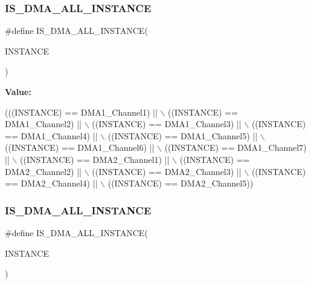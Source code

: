 \subsubsection{\texorpdfstring{I\+S\+\_\+\+D\+M\+A\+\_\+\+A\+L\+L\+\_\+\+I\+N\+S\+T\+A\+N\+CE}{IS\_DMA\_ALL\_INSTANCE}\hspace{0.1cm}{\footnotesize\ttfamily [15/16]}}
{\footnotesize\ttfamily \#define I\+S\+\_\+\+D\+M\+A\+\_\+\+A\+L\+L\+\_\+\+I\+N\+S\+T\+A\+N\+CE(\begin{DoxyParamCaption}\item[{}]{I\+N\+S\+T\+A\+N\+CE }\end{DoxyParamCaption})}

{\bfseries Value\+:}
\begin{DoxyCode}
(((INSTANCE) == DMA1\_Channel1) || \(\backslash\)
                                       ((INSTANCE) == DMA1\_Channel2) || \(\backslash\)
                                       ((INSTANCE) == DMA1\_Channel3) || \(\backslash\)
                                       ((INSTANCE) == DMA1\_Channel4) || \(\backslash\)
                                       ((INSTANCE) == DMA1\_Channel5) || \(\backslash\)
                                       ((INSTANCE) == DMA1\_Channel6) || \(\backslash\)
                                       ((INSTANCE) == DMA1\_Channel7) || \(\backslash\)
                                       ((INSTANCE) == DMA2\_Channel1) || \(\backslash\)
                                       ((INSTANCE) == DMA2\_Channel2) || \(\backslash\)
                                       ((INSTANCE) == DMA2\_Channel3) || \(\backslash\)
                                       ((INSTANCE) == DMA2\_Channel4) || \(\backslash\)
                                       ((INSTANCE) == DMA2\_Channel5))
\end{DoxyCode}
\mbox{\label{group___exported__macro_ga40beb02b397c5f47e22a83fc28034afe}} 
\subsubsection{\texorpdfstring{I\+S\+\_\+\+D\+M\+A\+\_\+\+A\+L\+L\+\_\+\+I\+N\+S\+T\+A\+N\+CE}{IS\_DMA\_ALL\_INSTANCE}\hspace{0.1cm}{\footnotesize\ttfamily [16/16]}}
{\footnotesize\ttfamily \#define I\+S\+\_\+\+D\+M\+A\+\_\+\+A\+L\+L\+\_\+\+I\+N\+S\+T\+A\+N\+CE(\begin{DoxyParamCaption}\item[{}]{I\+N\+S\+T\+A\+N\+CE }\end{DoxyParamCaption})}

